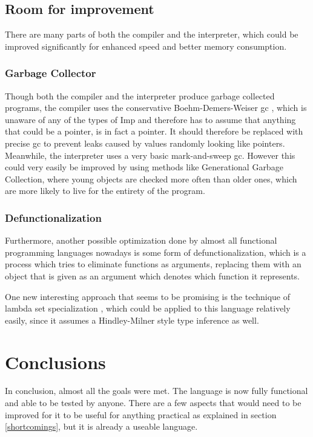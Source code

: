 \documentclass[12pt]{article}
\begin{document}
\subsection{Room for improvement}
There are many parts of both the compiler and the
interpreter, which could be improved significantly
for enhanced speed and better memory consumption.

\subsubsection{Garbage Collector}
Though both the compiler and the interpreter produce
garbage collected programs, the compiler uses the
conservative Boehm-Demers-Weiser \Gls{gc} \autocite{GarbageCollector},
which is unaware of any of the types of Imp and therefore
has to assume that anything that could be a pointer,
is in fact a pointer. It should therefore be replaced with
precise \Gls{gc} to prevent leaks caused by values randomly looking
like pointers.
Meanwhile, the interpreter uses a very basic mark-and-sweep
\Gls{gc}. However this could very easily be improved
by using methods like Generational Garbage Collection, where
young objects are checked more often than older ones, which are more
likely to live for the entirety of the program.

\subsubsection{Defunctionalization}
Furthermore, another possible optimization done by almost all
functional programming languages nowadays is some form of
defunctionalization, which is a process which tries
to eliminate functions as arguments, replacing them with
an object that is given as an argument which denotes which
function it represents.

One new interesting approach that seems to be promising
is the technique of lambda set specialization
\autocite{brandonBetterDefunctionalizationLambda2023a}, which
could be applied to this language relatively easily,
since it assumes a Hindley-Milner style type inference
as well.

\section{Conclusions}
In conclusion, almost all the goals were met.
The language is now fully functional and able to be tested by anyone.
There are a few aspects that would need to be improved for it to be
useful for anything practical as explained in section \ref{shortcomings},
but it is already a useable language.
\end{document}
